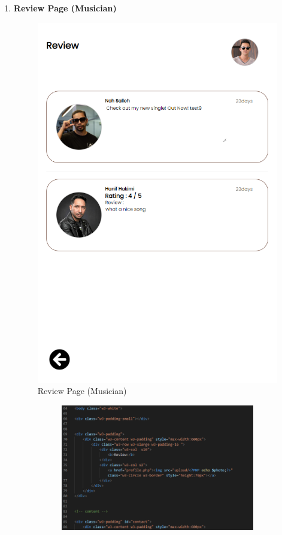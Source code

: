 \begin{enumerate}[1.]
    \item \textbf{Review Page (Musician)}
    \begin{figure}[h]
        \centering
        \includegraphics[width=0.5\linewidth]{mainmatter/images/frontend/ss/Review (Musician).png}
        \caption{Review Page (Musician)}
        \label{fig:myfig58}
    \end{figure}
    \begin{figure}[h]\ContinuedFloat
        \centering
        \begin{subfigure}[b]{0.7\textwidth}
            \centering
            \includegraphics[width=\textwidth]{mainmatter/images/frontend/code/mreview.png}
            \label{fig:sub1}
        \end{subfigure}
        \hspace{0.04\textwidth}
        \begin{subfigure}[b]{0.7\textwidth}

\end{subfigure}
\end{figure}
\end{enumerate}
